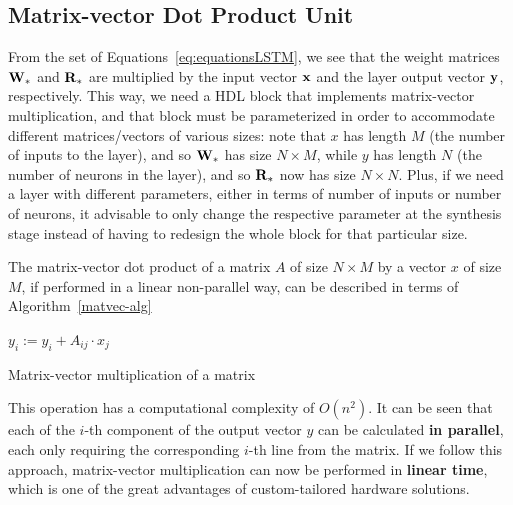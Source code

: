 \subsection{Matrix-vector Dot Product Unit}\label{sec:dotprod_sec}
From the set of Equations~\ref{eq:equationsLSTM}, we see that the weight matrices $\mathbf{W}_*$ and $\mathbf{R}_*$ are multiplied by the input vector $\mathbf{x}$ and the layer output vector $\mathbf{y}$, respectively. This way, we need a HDL block that implements matrix-vector multiplication, and that block must be parameterized in order to accommodate different matrices/vectors of various sizes: note that $x$ has length $M$ (the number of inputs to the layer), and so $\mathbf{W}_*$ has size $N\times M$, while $y$ has length $N$ (the number of neurons in the layer), and so $\mathbf{R}_*$ now has size $N\times N$. Plus, if we need a layer with different parameters, either in terms of number of inputs or number of neurons, it advisable to only change the respective parameter at the synthesis stage instead of having to redesign the whole block for that particular size. 

The matrix-vector dot product of a matrix $A$ of size $N \times M$ by a vector $x$ of size $M$, if performed in a linear non-parallel way, can be described in terms of Algorithm~\ref{matvec-alg}

\begin{algorithm}
\begin{algorithmic}
    \State $y_i := y_i + A_{ij} \cdot x_j$
    \EndFor
\EndFor
\end{algorithmic}
\caption{Matrix-vector multiplication of a matrix}
\label{matvec-alg}
\end{algorithm}
This operation has a computational complexity of $O(n^2)$. It can be seen that each of the $i$-th component of the output vector $y$ can be calculated \textbf{in parallel}, each only requiring the corresponding $i$-th line from the matrix. If we follow this approach, matrix-vector multiplication can now be performed in \textbf{linear time}, which is one of the great advantages of custom-tailored hardware solutions. 

